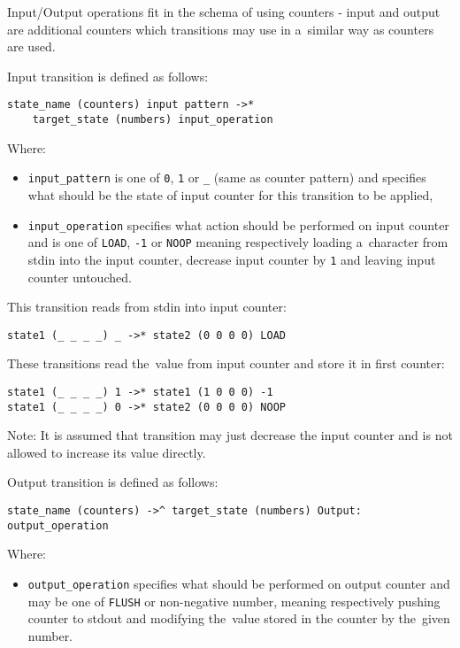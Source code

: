 \documentclass[english,shortabstract,mgr]{iithesis}
\begin{document}
Input/Output operations fit in the schema of using counters - input and output
are additional counters which transitions may use in a~similar way as counters are used.

Input transition is defined as follows:
\begin{verbatim}
state_name (counters) input pattern ->*
    target_state (numbers) input_operation
\end{verbatim}

Where:
\begin{itemize}
  \item \texttt{input\_pattern} is one of \texttt{0}, \texttt{1} or \texttt{\_}
      (same as counter pattern) and specifies what should be the state
      of input counter for this transition to be applied,
  \item \texttt{input\_operation} specifies what action should be performed
      on input counter and is one of \texttt{LOAD}, \texttt{-1} or \texttt{NOOP}
      meaning respectively loading a~character from stdin into the input counter,
      decrease input counter by \texttt{1} and leaving input counter untouched.
\end{itemize}

This transition reads from stdin into input counter:
\begin{verbatim}
state1 (_ _ _ _) _ ->* state2 (0 0 0 0) LOAD
\end{verbatim}

These transitions read the~value from input counter and store it in first counter:
\begin{verbatim}
state1 (_ _ _ _) 1 ->* state1 (1 0 0 0) -1
state1 (_ _ _ _) 0 ->* state2 (0 0 0 0) NOOP
\end{verbatim}

Note: It is assumed that transition may just decrease the input counter
and is not allowed to increase its value directly.

Output transition is defined as follows:
\begin{verbatim}
state_name (counters) ->^ target_state (numbers) Output: output_operation
\end{verbatim}

Where:
\begin{itemize}
  \item \texttt{output\_operation} specifies what should be performed
      on output counter and may be one of \texttt{FLUSH} or non-negative number,
      meaning respectively pushing counter to stdout and modifying
      the~value stored in the counter by the~given number.
\end{itemize}
\end{document}
